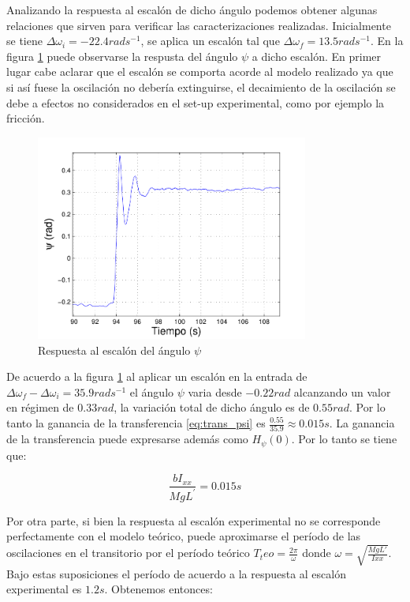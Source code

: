 \documentclass[main]{subfiles}
\begin{document}
Analizando la respuesta al escal\'on de dicho \'angulo podemos obtener algunas relaciones que sirven para verificar las caracterizaciones realizadas. Inicialmente se tiene $\Delta \omega_i = -22.4 rad s^{-1}$, se aplica un escal\'on tal que $\Delta \omega_f = 13.5 rad s^{-1}$. En la figura \ref{fig:esc_psi} puede observarse la respusta del \'angulo $\psi$ a dicho escal\'on. En primer lugar cabe aclarar que el escal\'on se comporta acorde al modelo realizado ya que si as\'i fuese la oscilaci\'on no deber\'ia extinguirse, el decaimiento de la oscilaci\'on se debe a efectos no considerados en el set-up experimental, como por ejemplo la fricci\'on.\\

\begin{figure}
  \centering
 \includegraphics[width=0.8\textwidth]{./pics_verificacion/esc_psi}
  \caption{Respuesta al escal\'on del \'angulo $\psi$}
  \label{fig:esc_psi}
\end{figure}

De acuerdo a la figura \ref{fig:esc_psi} al aplicar un escal\'on en la entrada de $\Delta \omega_f - \Delta \omega_i = 35.9 rad s^{-1}$ el \'angulo $\psi$ varia desde $-0.22 rad$ alcanzando un valor en r\'egimen de $0.33 rad$, la variaci\'on total de dicho \'angulo es de $0.55 rad$. Por lo tanto la ganancia de la transferencia \ref{eq:trans_psi} es $\frac{0.55}{35.9}  \approx 0.015 s$. La ganancia de la transferencia puede expresarse adem\'as como $H_{\psi}(0)$. Por lo tanto se tiene que:

\begin{equation}
\frac{bI_{xx}}{MgL^\prime} = 0.015 s
\end{equation}

Por otra parte, si bien la respuesta al escal\'on experimental no se corresponde perfectamente con el modelo te\'orico, puede aproximarse el per\'iodo de las oscilaciones en el transitorio por el per\'iodo te\'orico $T_teo = \frac{2\pi}{\omega}$ donde $\omega = \sqrt{\frac{MgL\prime}{Ixx}}$. Bajo estas suposiciones el per\'iodo de acuerdo a la respuesta al escal\'on experimental es $1.2s$. Obtenemos entonces:
\end{document}
